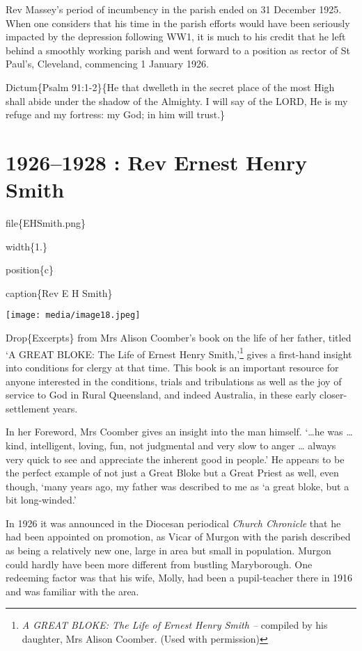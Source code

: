 Rev Massey's period of incumbency in the parish ended on 31 December 1925. When one considers that his time in the parish efforts would have been seriously impacted by the depression following WW1, it is much to his credit that he left behind a smoothly working parish and went forward to a position as rector of St Paul's, Cleveland, commencing 1 January 1926.

Dictum\{Psalm 91:1-2\}\{He that dwelleth in the secret place of the most High shall abide under the shadow of the Almighty. I will say of the LORD, He is my refuge and my fortress: my God; in him will trust.\}

\hypertarget{rev-ernest-henry-smith}{%
\chapter{1926--1928 : Rev Ernest Henry Smith}\label{rev-ernest-henry-smith}}

file\{EHSmith.png\}

width\{1.\}

position\{c\}

caption\{Rev E H Smith\}

\texttt{[image: media/image18.jpeg]}

Drop\{Excerpts\} from Mrs Alison Coomber's book on the life of her father, titled `A GREAT BLOKE: The Life of Ernest Henry Smith,'\footnote{\emph{A GREAT BLOKE: The Life of Ernest Henry Smith --} compiled by his daughter, Mrs Alison Coomber. (Used with permission)} gives a first-hand insight into conditions for clergy at that time. This book is an important resource for anyone interested in the conditions, trials and tribulations as well as the joy of service to God in Rural Queensland, and indeed Australia, in these early closer-settlement years.

In her Foreword, Mrs Coomber gives an insight into the man himself. `\ldots he was \ldots{} kind, intelligent, loving, fun, not judgmental and very slow to anger \ldots{} always very quick to see and appreciate the inherent good in people.' He appears to be the perfect example of not just a Great Bloke but a Great Priest as well, even though, `many years ago, my father was described to me as `a great bloke, but a bit long-winded.'

In 1926 it was announced in the Diocesan periodical \emph{Church Chronicle} that he had been appointed on promotion, as Vicar of Murgon with the parish described as being a relatively new one, large in area but small in population. Murgon could hardly have been more different from bustling Maryborough. One redeeming factor was that his wife, Molly, had been a pupil-teacher there in 1916 and was familiar with the area.

